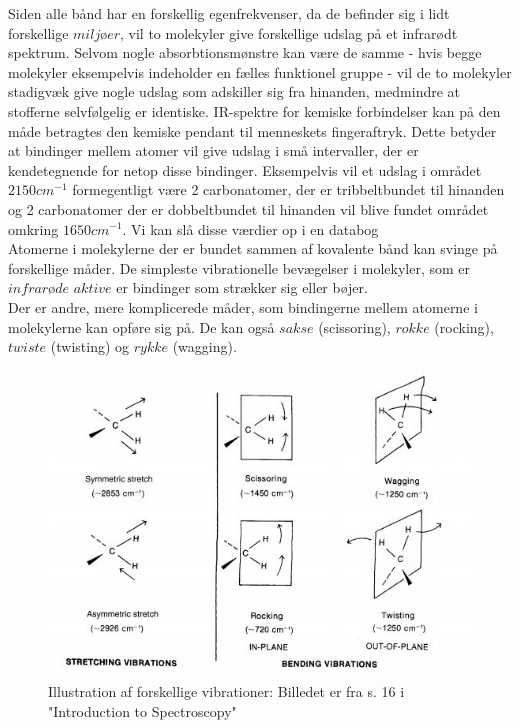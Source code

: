 Siden alle bånd har en forskellig egenfrekvenser, da de befinder sig i lidt forskellige $miljøer$, vil to molekyler give forskellige udslag på et infrarødt spektrum. Selvom nogle absorbtionsmønstre kan være de samme - hvis begge molekyler eksempelvis indeholder en fælles funktionel gruppe - vil de to molekyler stadigvæk give nogle udslag som adskiller sig fra hinanden, medmindre at stofferne selvfølgelig er identiske. IR-spektre for kemiske forbindelser kan på den måde betragtes den kemiske pendant til menneskets fingeraftryk. Dette betyder at bindinger mellem atomer vil give udslag i små intervaller, der er kendetegnende for netop disse bindinger. Eksempelvis vil et udslag i området $2150cm^{-1}$ formegentligt være 2 carbonatomer, der er tribbeltbundet til hinanden og 2 carbonatomer der er dobbeltbundet til hinanden vil blive fundet området omkring $1650cm^{-1}$. Vi kan slå disse værdier op i en databog
\\

Atomerne i molekylerne der er bundet sammen af kovalente bånd kan svinge på forskellige måder. De simpleste vibrationelle bevægelser i molekyler, som er $infrarøde$ $aktive$ er bindinger som strækker sig eller bøjer.
\\

Der er andre, mere komplicerede måder, som bindingerne mellem atomerne i molekylerne kan opføre sig på. De kan også $sakse$ (scissoring), $rokke$ (rocking), $twiste$ (twisting) og $rykke$ (wagging). 
\\

\begin{center}
\begin{figure}
\includegraphics[scale=1]{Billeder/streak}
\caption{Illustration af forskellige vibrationer: Billedet er fra s. 16 i "Introduction to Spectroscopy" \label{fig:spek}}
\end{figure}
\end{center}


